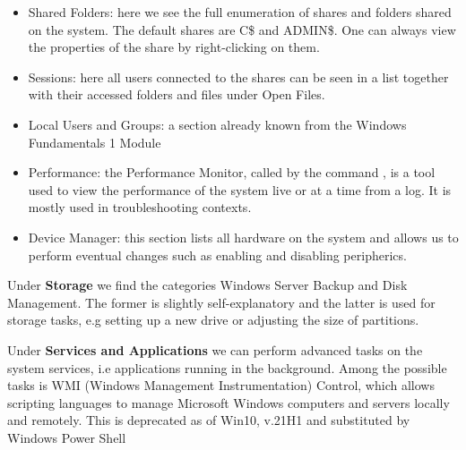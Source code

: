 {\begin{itemize}
They are subdivided into Application logs, its recording determined by the app developer; Security logs, such as logon attempts and events related to resources (e.g files and drives) on the system; System logs, given by system components such as drives' loading logs; and CustomLogs, an umbrella term for any event logged by applications.
\item Shared Folders: here we see the full enumeration of shares and folders shared on the system. The default shares are C\$ and ADMIN\$. One can always view the properties of the share by right-clicking on them.
\item Sessions: here all users connected to the shares can be seen in a list together with their accessed folders and files under Open Files. \\
\item Local Users and Groups: a section already known from the Windows Fundamentals 1 Module
\item Performance: the Performance Monitor, called by the command , is a tool used to view the performance of the system live or at a time from a log. It is mostly used in troubleshooting contexts. 
\item Device Manager: this section lists all hardware on the system and allows us to perform eventual changes such as enabling and disabling peripherics.
\end{itemize}

Under \textbf{Storage} we find the categories Windows Server Backup and Disk Management. The former is slightly self-explanatory and the latter is used for storage tasks, e.g setting up a new drive or adjusting the size of partitions.

Under \textbf{Services and Applications} we can perform advanced tasks on the system services, i.e applications running in the background. Among the possible tasks is WMI (Windows Management Instrumentation) Control, which allows scripting languages to manage Microsoft Windows computers and servers locally and remotely. This is deprecated as of Win10, v.21H1 and substituted by Windows Power Shell

}
